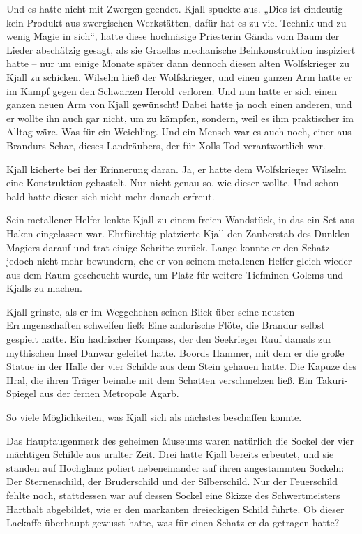 \documentclass[10pt, a4paper, oneside]{book}
\begin{document}
Und es hatte nicht mit Zwergen geendet. Kjall spuckte aus. „Dies ist eindeutig kein Produkt aus zwergischen Werkstätten, dafür hat es zu viel Technik und zu wenig Magie in sich“, hatte diese hochnäsige Priesterin Gända vom Baum der Lieder abschätzig gesagt, als sie Graellas mechanische Beinkonstruktion inspiziert hatte – nur um einige Monate später dann dennoch diesen alten Wolfskrieger zu Kjall zu schicken. Wilselm hieß der Wolfskrieger, und einen ganzen Arm hatte er im Kampf gegen den Schwarzen Herold verloren. Und nun hatte er sich einen ganzen neuen Arm von Kjall gewünscht! Dabei hatte ja noch einen anderen, und er wollte ihn auch gar nicht, um zu kämpfen, sondern, weil es ihm praktischer im Alltag wäre. Was für ein Weichling. Und ein Mensch war es auch noch, einer aus Brandurs Schar, dieses Landräubers, der für Xolls Tod verantwortlich war.

Kjall kicherte bei der Erinnerung daran. Ja, er hatte dem Wolfskrieger Wilselm eine Konstruktion gebastelt. Nur nicht genau so, wie dieser wollte. Und schon bald hatte dieser sich nicht mehr danach erfreut.

Sein metallener Helfer lenkte Kjall zu einem freien Wandstück, in das ein Set aus Haken eingelassen war. Ehrfürchtig platzierte Kjall den Zauberstab des Dunklen Magiers darauf und trat einige Schritte zurück. Lange konnte er den Schatz jedoch nicht mehr bewundern, ehe er von seinem metallenen Helfer gleich wieder aus dem Raum gescheucht wurde, um Platz für weitere Tiefminen-Golems und Kjalls zu machen.

Kjall grinste, als er im Weggehehen seinen Blick über seine neusten Errungenschaften schweifen ließ: Eine andorische Flöte, die Brandur selbst gespielt hatte. Ein hadrischer Kompass, der den Seekrieger Ruuf damals zur mythischen Insel Danwar geleitet hatte. Boords Hammer, mit dem er die große Statue in der Halle der vier Schilde aus dem Stein gehauen hatte. Die Kapuze des Hral, die ihren Träger beinahe mit dem Schatten verschmelzen ließ. Ein Takuri-Spiegel aus der fernen Metropole Agarb.

So viele Möglichkeiten, was Kjall sich als nächstes beschaffen konnte.

Das Hauptaugenmerk des geheimen Museums waren natürlich die Sockel der vier mächtigen Schilde aus uralter Zeit. Drei hatte Kjall bereits erbeutet, und sie standen auf Hochglanz poliert nebeneinander auf ihren angestammten Sockeln: Der Sternenschild, der Bruderschild und der Silberschild. Nur der Feuerschild fehlte noch, stattdessen war auf dessen Sockel eine Skizze des Schwertmeisters Harthalt abgebildet, wie er den markanten dreieckigen Schild führte. Ob dieser Lackaffe überhaupt gewusst hatte, was für einen Schatz er da getragen hatte?
\end{document}
